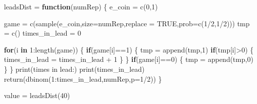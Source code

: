 \documentclass[
]{article}
\newenvironment{Shaded}{\begin{snugshade}}{\end{snugshade}}
\newcommand{\AttributeTok}[1]{\textcolor[rgb]{0.77,0.63,0.00}{#1}}
\newcommand{\ConstantTok}[1]{\textcolor[rgb]{0.00,0.00,0.00}{#1}}
\newcommand{\ControlFlowTok}[1]{\textcolor[rgb]{0.13,0.29,0.53}{\textbf{#1}}}
\newcommand{\DecValTok}[1]{\textcolor[rgb]{0.00,0.00,0.81}{#1}}
\newcommand{\FunctionTok}[1]{\textcolor[rgb]{0.00,0.00,0.00}{#1}}
\newcommand{\NormalTok}[1]{#1}
\newcommand{\OtherTok}[1]{\textcolor[rgb]{0.56,0.35,0.01}{#1}}
\newcommand{\SpecialCharTok}[1]{\textcolor[rgb]{0.00,0.00,0.00}{#1}}
\newcommand{\StringTok}[1]{\textcolor[rgb]{0.31,0.60,0.02}{#1}}
\begin{document}
\begin{Shaded}
\begin{Highlighting}[]
\NormalTok{leadsDist }\OtherTok{=} \ControlFlowTok{function}\NormalTok{(numRep)}
\NormalTok{\{}
\NormalTok{  e\_coin }\OtherTok{=} \FunctionTok{c}\NormalTok{(}\DecValTok{0}\NormalTok{,}\DecValTok{1}\NormalTok{)}

\NormalTok{  game }\OtherTok{=} \FunctionTok{c}\NormalTok{(}\FunctionTok{sample}\NormalTok{(e\_coin,}\AttributeTok{size=}\NormalTok{numRep,}\AttributeTok{replace =} \ConstantTok{TRUE}\NormalTok{,}\AttributeTok{prob=}\FunctionTok{c}\NormalTok{(}\DecValTok{1}\SpecialCharTok{/}\DecValTok{2}\NormalTok{,}\DecValTok{1}\SpecialCharTok{/}\DecValTok{2}\NormalTok{)))}
\NormalTok{  tmp }\OtherTok{=} \FunctionTok{c}\NormalTok{()}
\NormalTok{  times\_in\_lead }\OtherTok{=} \DecValTok{0}

  \ControlFlowTok{for}\NormalTok{(i }\ControlFlowTok{in} \DecValTok{1}\SpecialCharTok{:}\FunctionTok{length}\NormalTok{(game))}
\NormalTok{  \{}
    \ControlFlowTok{if}\NormalTok{(game[i]}\SpecialCharTok{==}\DecValTok{1}\NormalTok{)}
\NormalTok{    \{}
\NormalTok{      tmp }\OtherTok{=} \FunctionTok{append}\NormalTok{(tmp,}\DecValTok{1}\NormalTok{)}
      \ControlFlowTok{if}\NormalTok{(tmp[i]}\SpecialCharTok{\textgreater{}}\DecValTok{0}\NormalTok{)}
\NormalTok{      \{}
\NormalTok{        times\_in\_lead }\OtherTok{=}\NormalTok{ times\_in\_lead }\SpecialCharTok{+} \DecValTok{1}
\NormalTok{      \}}
\NormalTok{    \}}
    \ControlFlowTok{if}\NormalTok{(game[i]}\SpecialCharTok{==}\DecValTok{0}\NormalTok{)}
\NormalTok{    \{}
\NormalTok{      tmp }\OtherTok{=} \FunctionTok{append}\NormalTok{(tmp,}\DecValTok{0}\NormalTok{)}
\NormalTok{    \}}
\NormalTok{  \}}
  \FunctionTok{print}\NormalTok{(}\StringTok{\textquotesingle{}times in lead:\textquotesingle{}}\NormalTok{)}
  \FunctionTok{print}\NormalTok{(times\_in\_lead)}
  \FunctionTok{return}\NormalTok{(}\FunctionTok{dbinom}\NormalTok{(}\DecValTok{1}\SpecialCharTok{:}\NormalTok{times\_in\_lead,numRep,}\AttributeTok{p=}\DecValTok{1}\SpecialCharTok{/}\DecValTok{2}\NormalTok{))}
\NormalTok{\}}
\end{Highlighting}
\end{Shaded}

\begin{Shaded}
\begin{Highlighting}[]
\NormalTok{value }\OtherTok{=} \FunctionTok{leadsDist}\NormalTok{(}\DecValTok{40}\NormalTok{)}
\end{Highlighting}
\end{Shaded}
\end{document}
